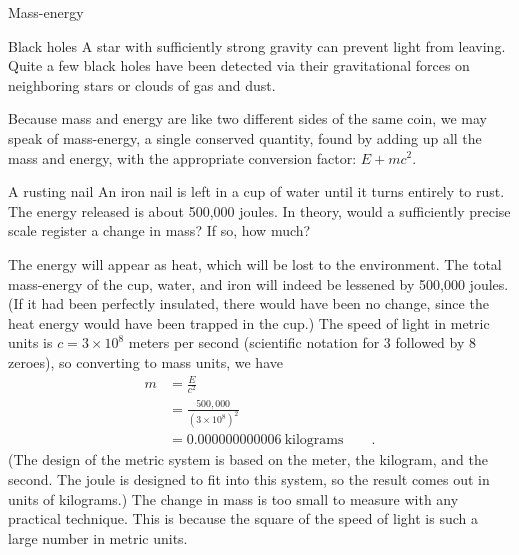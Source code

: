 \begin{envsubsection}{Mass-energy}

\begin{eg}{Black holes}
A star with sufficiently strong gravity can prevent light
from leaving. Quite a few black holes have been detected via
their gravitational forces on neighboring stars or clouds of gas and dust.
\end{eg}


Because mass and energy are like two different sides of the same coin, we may speak of
mass-energy, a single conserved quantity, found by adding up all the mass and energy,
with the appropriate conversion factor: $E+mc^2$.

\begin{eg}{A rusting nail}\label{eg:rustingnail}
\egquestion
An iron nail is left in a cup of water
until it turns entirely to rust. The energy released is
about 500,000 joules. In theory, would a sufficiently
precise scale register a change in mass? If so, how much?

\eganswer
 The energy will appear as heat, which will be lost
to the environment. The total mass-energy of the cup,
water, and iron will indeed be lessened by 500,000 joules. (If it
had been perfectly insulated, there would have been no
change, since the heat energy would have been trapped in the
cup.) The speed of light in metric units is
$c=3\times10^8$ meters per second (scientific notation for
3 followed by 8 zeroes), so converting to mass units, we have
\begin{align*}
		m	 &=    \frac{E}{c^2}  \\
			&= \frac{500,000}{\left(3\times10^8\right)^2} \\
			 &=    0.000000000006\  \text{kilograms}   \qquad   .
\end{align*}
(The design of the metric system is based on the meter, the kilogram, and the
second. The joule is designed to fit into this system, so the result comes
out in units of kilograms.)
The change in mass is too small to measure with any
practical technique. This is because the square of the speed
of light is such a large number in metric units.
\end{eg}
\end{envsubsection}
%

